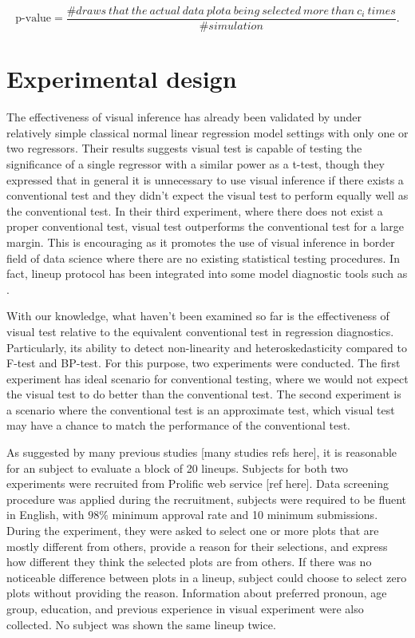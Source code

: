 \documentclass[]{interact}
\theoremstyle{plain}%
\theoremstyle{definition}
\theoremstyle{remark}
\begin{document}
\begin{equation} \label{eq:p-value-multi}
\text{p-value} = \frac{\#draws~that~the~actual~data~plota~being~selected~more~than~c_i~times}{\#simulation}.
\end{equation}

\hypertarget{experimental-design}{%
\section{Experimental design}\label{experimental-design}}

The effectiveness of visual inference has already been validated by
\citet{majumder_validation_2013} under relatively simple classical
normal linear regression model settings with only one or two regressors.
Their results suggests visual test is capable of testing the
significance of a single regressor with a similar power as a t-test,
though they expressed that in general it is unnecessary to use visual
inference if there exists a conventional test and they didn't expect the
visual test to perform equally well as the conventional test. In their
third experiment, where there does not exist a proper conventional test,
visual test outperforms the conventional test for a large margin. This
is encouraging as it promotes the use of visual inference in border
field of data science where there are no existing statistical testing
procedures. In fact, lineup protocol has been integrated into some model
diagnostic tools such as \citet{loy2013diagnostic}.

With our knowledge, what haven't been examined so far is the
effectiveness of visual test relative to the equivalent conventional
test in regression diagnostics. Particularly, its ability to detect
non-linearity and heteroskedasticity compared to F-test and BP-test. For
this purpose, two experiments were conducted. The first experiment has
ideal scenario for conventional testing, where we would not expect the
visual test to do better than the conventional test. The second
experiment is a scenario where the conventional test is an approximate
test, which visual test may have a chance to match the performance of
the conventional test.

As suggested by many previous studies {[}many studies refs here{]}, it
is reasonable for an subject to evaluate a block of 20 lineups. Subjects
for both two experiments were recruited from Prolific web service {[}ref
here{]}. Data screening procedure was applied during the recruitment,
subjects were required to be fluent in English, with \(98\%\) minimum
approval rate and 10 minimum submissions. During the experiment, they
were asked to select one or more plots that are mostly different from
others, provide a reason for their selections, and express how different
they think the selected plots are from others. If there was no
noticeable difference between plots in a lineup, subject could choose to
select zero plots without providing the reason. Information about
preferred pronoun, age group, education, and previous experience in
visual experiment were also collected. No subject was shown the same
lineup twice.
\end{document}
